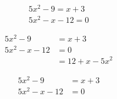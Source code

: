 \documentclass{article}
\begin{document}
	\begin{align}
		5x^2-9=x+3\\
		5x^2-x-12=0
	\end{align}
	
	\begin{align*}
		5x^2-9&=x+3\\
		5x^2-x-12&=0\\
		&=12+x-5x^2
	\end{align*}
	
	\begin{align}
		5x^2-9&=x+3\\
		5x^2-x-12&=0
	\end{align}
	
\end{document}
